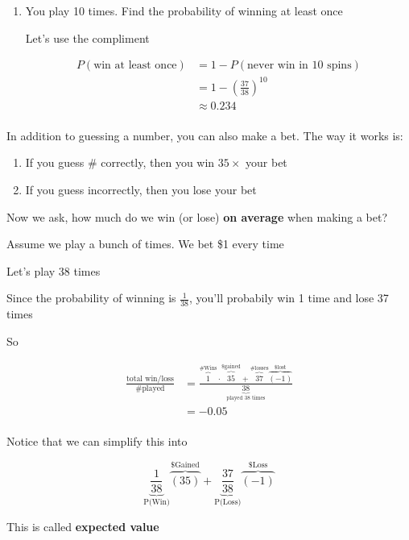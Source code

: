 \documentclass[../../Main.tex]{subfiles}
\begin{document}
\begin{example}
\begin{enumerate}
        \item
        {
            You play 10 times. Find the probability of winning at least once

            Let's use the compliment

            \begin{align*}
                P(\text{win at least once}) &= 1 - P(\text{never win in 10 spins}) \\
                &= 1 - \left(\frac{37}{38}\right)^{10} \\
                &\approx \boxed{0.234} \\
            \end{align*}
        }
    \end{enumerate}

    In addition to guessing a number, you can also make a bet. The way it works is:

    \begin{enumerate}
        \item If you guess \# correctly, then you win $35 \times$ your bet
        \item If you guess incorrectly, then you lose your bet
    \end{enumerate}

    Now we ask, how much do we win (or lose) \textbf{on average} when making a bet?

    Assume we play a bunch of times. We bet \$1 every time

    Let's play 38 times

    Since the probability of winning is $\frac{1}{38}$, you'll probabily win 1 time and lose 37 times

    So

    \begin{align*}
        \frac{\text{total win/loss}}{\text{\# played}} &= 
            \frac{
                \overbrace{1}^{\text{\# Wins}} 
                \cdot 
                \overbrace{35}^{\text{\$ gained}} 
                + 
                \overbrace{37}^{\text{\# losses}}
                \overbrace{(-1)}^{\text{\$ lost}}
            }{\underbrace{38}_{\text{played 38 times}}} \\
        &= \boxed{-0.05} \\
    \end{align*}

    Notice that we can simplify this into

    $$
        \underbrace{\frac{1}{38}}_{\text{P(Win)}}
        \overbrace{(35)}^{\text{\$ Gained}} 
        + 
        \underbrace{\frac{37}{38}}_{\text{P(Loss)}}
        \overbrace{(-1)}^{\text{\$ Loss}}
    $$

    This is called \textbf{expected value}
\end{example}
\end{document}
